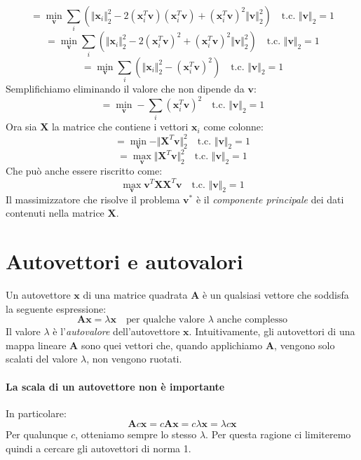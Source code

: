 \documentclass{article}
\begin{document}
        \[ = \min_\mathbf{v} \sum_i (\Vert \mathbf{x}_i \Vert_2^2 - 2(\mathbf{x}_i^T \mathbf{v})(\mathbf{x}_i^T\mathbf{v}) + (\mathbf{x}_i^T \mathbf{v})^2 \Vert \mathbf{v} \Vert_2^2)\quad \text{t.c. } \Vert \mathbf{v} \Vert_2 = 1\]
        \[ = \min_\mathbf{v} \sum_i (\Vert \mathbf{x}_i \Vert_2^2 - 2(\mathbf{x}_i^T \mathbf{v})^2 + (\mathbf{x}_i^T \mathbf{v})^2 \Vert \mathbf{v} \Vert_2^2)\quad \text{t.c. } \Vert \mathbf{v} \Vert_2 = 1\]
        \[ = \min_\mathbf{v} \sum_i (\Vert \mathbf{x}_i \Vert_2^2 - (\mathbf{x}_i^T \mathbf{v})^2)\quad \text{t.c. } \Vert \mathbf{v} \Vert_2 = 1\]
        Semplifichiamo eliminando il valore che non dipende da $\mathbf{v}$:
        \[ = \min_\mathbf{v} - \sum_i (\mathbf{x}_i^T\mathbf{v})^2 \quad \text{t.c. } \Vert \mathbf{v} \Vert_2 = 1\]
        Ora sia $\mathbf{X}$ la matrice che contiene i vettori $\mathbf{x}_i$ come colonne:
        \[ = \min_\mathbf{v} - \Vert \mathbf{X}^T \mathbf{v} \Vert_2^2 \quad \text{t.c. } \Vert \mathbf{v} \Vert_2 = 1\]
        \[ = \max_\mathbf{v} \Vert \mathbf{X}^T\mathbf{v} \Vert^2_2 \quad \text{t.c. } \Vert \mathbf{v} \Vert_2 = 1\]
        Che può anche essere riscritto come:
        \[\max_\mathbf{v} \mathbf{v}^T\mathbf{XX}^T\mathbf{v}\quad \text{t.c. } \Vert \mathbf{v} \Vert_2 = 1 \]
        Il massimizzatore che risolve il problema $\mathbf{v^*}$ è il \emph{componente principale} dei dati contenuti 
        nella matrice $\mathbf{X}$.

    \section{Autovettori e autovalori}
        Un autovettore $\mathbf{x}$ di una matrice quadrata $\mathbf{A}$ è un qualsiasi vettore che soddisfa la seguente 
        espressione:
        \[\mathbf{Ax} = \lambda\mathbf{x} \quad \text{per qualche valore }\lambda\text{ anche complesso}\]
        Il valore $\lambda$ è l'\emph{autovalore} dell'autovettore $\mathbf{x}$.
        Intuitivamente, gli autovettori di una mappa lineare $\mathbf{A}$ sono quei vettori che, quando applichiamo $\mathbf{A}$,
        vengono solo scalati del valore $\lambda$, non vengono ruotati.
        \paragraph{La scala di un autovettore non è importante} In particolare:
        \[\mathbf{A}c\mathbf{x} = c\mathbf{Ax} = c \lambda \mathbf{x} = \lambda c\mathbf{x} \]
        Per qualunque $c$, otteniamo sempre lo stesso $\lambda$. Per questa ragione ci limiteremo quindi a cercare gli 
        autovettori di norma 1.
\end{document}
